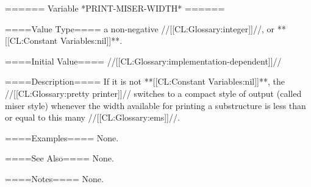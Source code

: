 ====== Variable *PRINT-MISER-WIDTH* ======

====Value Type====
a non-negative //[[CL:Glossary:integer]]//, or **[[CL:Constant Variables:nil]]**.

====Initial Value====
//[[CL:Glossary:implementation-dependent]]//

====Description====
If it is not **[[CL:Constant Variables:nil]]**, the //[[CL:Glossary:pretty printer]]// switches to a compact style of output (called miser style) whenever the width available for printing a substructure is less than or equal to this many //[[CL:Glossary:ems]]//.

====Examples====
None.

====See Also====
None.

====Notes====
None.

